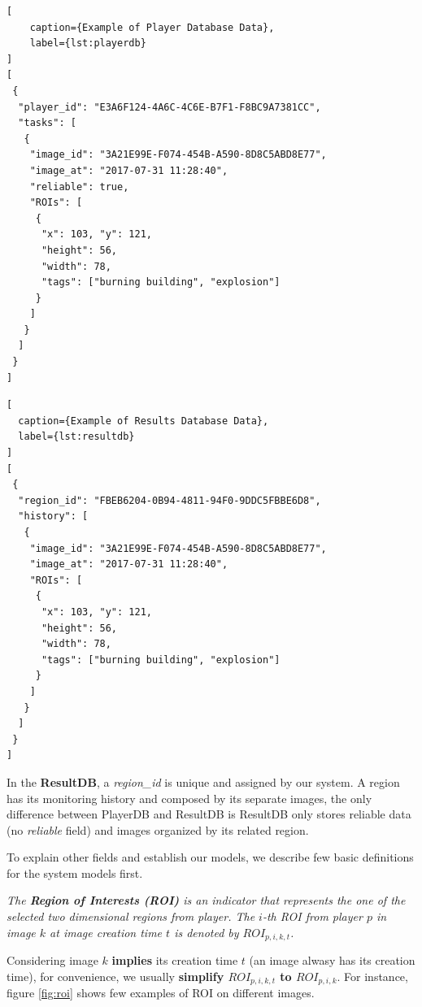 \noindent\begin{minipage}{.45\textwidth}
\begin{lstlisting}[
    caption={Example of Player Database Data},
    label={lst:playerdb}
]
[
 {
  "player_id": "E3A6F124-4A6C-4C6E-B7F1-F8BC9A7381CC",
  "tasks": [
   {
    "image_id": "3A21E99E-F074-454B-A590-8D8C5ABD8E77",
    "image_at": "2017-07-31 11:28:40",
    "reliable": true,
    "ROIs": [
     {
      "x": 103, "y": 121,
      "height": 56,
      "width": 78,
      "tags": ["burning building", "explosion"]
     }
    ]
   }
  ]
 }
]
\end{lstlisting}
\end{minipage}\hfill
\begin{minipage}{.45\textwidth}
\begin{lstlisting}[
  caption={Example of Results Database Data},
  label={lst:resultdb}
]
[
 {
  "region_id": "FBEB6204-0B94-4811-94F0-9DDC5FBBE6D8",
  "history": [
   {
    "image_id": "3A21E99E-F074-454B-A590-8D8C5ABD8E77",
    "image_at": "2017-07-31 11:28:40",
    "ROIs": [
     {
      "x": 103, "y": 121,
      "height": 56,
      "width": 78,
      "tags": ["burning building", "explosion"]
     }
    ]
   }
  ]
 }
]
\end{lstlisting}
\end{minipage}

In the \textbf{ResultDB}, a \emph{region\_id} is unique and assigned by our system. A region has its
monitoring history and composed by its separate images, the only difference between PlayerDB and ResultDB is
ResultDB only stores reliable data (no \emph{reliable} field) and images organized by its related region.

To explain other fields and establish our models, we describe few basic definitions for the system models first.

\begin{definition}
\label{def:roi}
\emph{The \textbf{Region of Interests (ROI)} is an indicator that represents the one of the selected two dimensional regions from player. 
The $i$-th ROI from player $p$ in image $k$ at image creation time $t$ is denoted by $ROI_{p,i,k,t}$.}
\end{definition}

Considering image $k$ \textbf{implies} its creation time $t$ (an image alwasy has its creation time), for convenience, 
we usually \textbf{simplify $ROI_{p,i,k,t}$ to $ROI_{p,i,k}$}.
For instance, figure \ref{fig:roi} shows few examples of ROI on different images.

